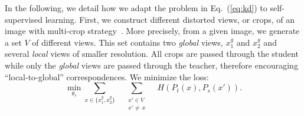 In the following, we detail how we adapt the problem in Eq.~(\ref{eq:kd}) to self-supervised learning.
First, we construct different distorted views, or crops, of an image with multi-crop strategy~\cite{caron2020unsupervised}.
More precisely, from a given image, we generate a set $V$ of different views.
This set contains two \emph{global} views, $x^{g}_1$ and $x^{g}_2$ and several \emph{local} views of smaller resolution.
All crops are passed through the student while only the \emph{global} views are passed through the teacher, therefore encouraging ``local-to-global'' correspondences.
We minimize the loss:
\begin{equation}
	\min_{\theta_s} \sum_{x \in \{x^{g}_1, x^{g}_2\}} \quad \sum_{\substack{x' \in V\\x'\neq \, x}} \quad H(P_t(x), P_s(x')).
\label{eq:loss}
\end{equation}


